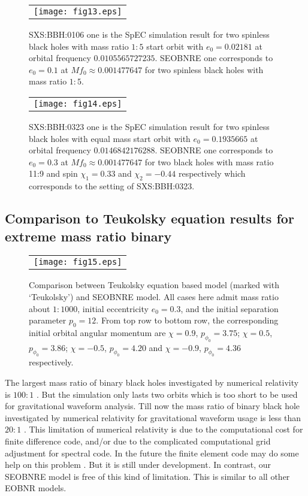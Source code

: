 \documentclass[prd,aps,a4paper,superscriptaddress,twocolumn,footinbib,showpacs]{revtex4}
\begin{document}
\begin{figure*}
\begin{tabular}{c}
\texttt{[image: fig13.eps]}
\end{tabular}
\caption{SXS:BBH:0106 one is the SpEC simulation result for two spinless black holes with mass ratio $1:5$ start orbit with $e_0=0.02181$ at orbital frequency $0.0105565727235$. SEOBNRE one corresponds to $e_0=0.1$ at $Mf_0\approx0.001477647$ for two spinless black holes with mass ratio $1:5$.}\label{fig13}
\end{figure*}

\begin{figure*}
\begin{tabular}{c}
\texttt{[image: fig14.eps]}
\end{tabular}
\caption{SXS:BBH:0323 one is the SpEC simulation result for two spinless black holes with equal mass start orbit with $e_0=0.1935665$ at orbital frequency $0.0146842176288$. SEOBNRE one corresponds to $e_0=0.3$ at $Mf_0\approx0.001477647$ for two black holes with mass ratio 11:9 and spin $\chi_1=0.33$ and $\chi_2=-0.44$ respectively which corresponds to the setting of SXS:BBH:0323.}\label{fig14}
\end{figure*}
\subsection{Comparison to Teukolsky equation results for extreme mass ratio binary}
\begin{figure*}
\begin{tabular}{c}
\texttt{[image: fig15.eps]}
\end{tabular}
\caption{Comparison between Teukolsky equation based model (marked with `Teukolsky') and SEOBNRE model. All cases here admit mass ratio about $1:1000$, initial eccentricity $e_0=0.3$, and the initial separation parameter $p_0=12$. From top row to bottom row, the corresponding initial orbital angular momentum are $\chi=0.9$, $p_{\phi_0}=3.75$; $\chi=0.5$, $p_{\phi_0}=3.86$; $\chi=-0.5$, $p_{\phi_0}=4.20$ and $\chi=-0.9$, $p_{\phi_0}=4.36$ respectively.}\label{fig15}
\end{figure*}
The largest mass ratio of binary black holes investigated by numerical relativity is $100:1$ \cite{PhysRevLett.106.041101}. But the simulation only lasts two orbits which is too short to be used for gravitational waveform analysis. Till now the mass ratio of binary black hole investigated by numerical relativity for gravitational waveform usage is less than $20:1$ \cite{PhysRevD.93.044006,PhysRevD.93.044007,chu2016accuracy,PhysRevD.93.104050}. This limitation of numerical relativity is due to the computational cost for finite difference code, and/or due to the complicated computational grid adjustment for spectral code. In the future the finite element code may do some help on this problem \cite{PhysRevD.91.044033,miller2016operator,KIDDER201784}. But it is still under development. In contrast, our SEOBNRE model is free of this kind of limitation. This is similar to all other EOBNR models.
\end{document}
